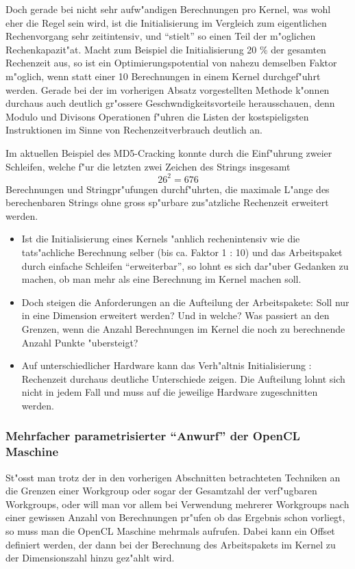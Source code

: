 \begin{refsection}
Doch gerade bei nicht sehr aufw"andigen Berechnungen pro Kernel, was wohl 
eher die Regel sein wird, ist die Initialisierung im Vergleich zum eigentlichen
Rechenvorgang sehr zeitintensiv, und ``stielt'' so einen Teil der m"oglichen
Rechenkapazit"at. Macht zum Beispiel die Initialisierung 20 \% der gesamten
Rechenzeit aus, so ist ein Optimierungspotential von nahezu demselben Faktor
m"oglich, wenn statt einer 10 Berechnungen in einem Kernel durchgef"uhrt 
werden. Gerade bei der im vorherigen Absatz vorgestellten Methode k"onnen
durchaus auch deutlich gr"ossere Geschwndigkeitsvorteile herausschauen, denn
Modulo und Divisons Operationen f"uhren die Listen der kostspieligsten 
Instruktionen im Sinne von Rechenzeitverbrauch deutlich an.

Im aktuellen Beispiel des MD5-Cracking konnte durch die Einf"uhrung zweier
Schleifen, welche f"ur die letzten zwei Zeichen des Strings insgesamt 
\[ 26^2 = 676 \] Berechnungen und Stringpr"ufungen durchf"uhrten, die 
maximale L"ange des berechenbaren Strings ohne gross sp"urbare zus"atzliche
Rechenzeit erweitert werden.

\begin{itemize}
 \item Ist die Initialisierung eines Kernels "anhlich rechenintensiv wie die
       tats"achliche Berechnung selber (bis ca. Faktor 1 : 10) und das 
       Arbeitspaket durch einfache Schleifen ``erweiterbar'', so lohnt
       es sich dar"uber Gedanken zu machen, ob man mehr als eine Berechnung
       im Kernel machen soll.
 \item Doch steigen die Anforderungen an die Aufteilung der Arbeitspakete:
       Soll nur in eine Dimension erweitert werden? Und in welche? Was 
       passiert an den Grenzen, wenn die Anzahl Berechnungen im Kernel die 
       noch zu berechnende Anzahl Punkte "ubersteigt?
 \item Auf unterschiedlicher Hardware kann das Verh"altnis Initialisierung : 
       Rechenzeit durchaus deutliche Unterschiede zeigen. Die Aufteilung
       lohnt sich nicht in jedem Fall und muss auf die jeweilige Hardware
       zugeschnitten werden.
\end{itemize}




\subsubsection{Mehrfacher parametrisierter ``Anwurf'' der OpenCL Maschine}

St"osst man trotz der in den vorherigen Abschnitten betrachteten Techniken
an die Grenzen einer Workgroup oder sogar der Gesamtzahl der verf"ugbaren
Workgroups, oder will man vor allem bei Verwendung mehrerer Workgroups 
nach einer gewissen Anzahl von Berechnungen pr"ufen ob das Ergebnis schon
vorliegt, so muss man die OpenCL Maschine mehrmals aufrufen. Dabei kann 
ein Offset definiert werden, der dann bei der Berechnung des Arbeitspakets
im Kernel zu der Dimensionszahl hinzu gez"ahlt wird.


\end{refsection}

